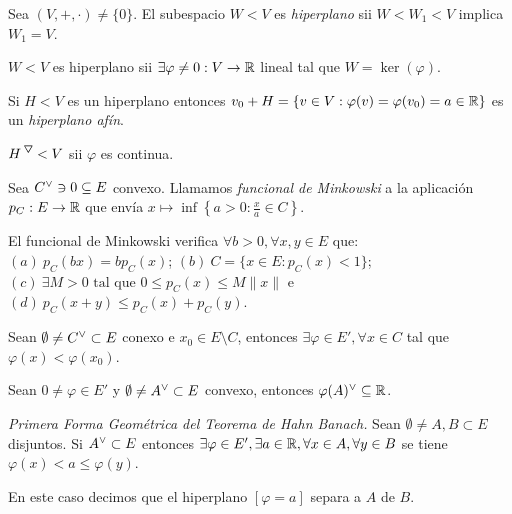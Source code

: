 \begin{definition}
    Sea \((V,+,\cdot)\neq \{0\}\). El subespacio \(W< V \) es \emph{hiperplano} sii \(W < W_1< V\) implica \(W_1= V\). 
\end{definition}
\begin{proposition}
    \(W<V\) es hiperplano sii \(\exists \varphi \neq 0: V \to \mathbb{R} \) lineal tal que \(W = \ker(\varphi)\). 
\end{proposition}
\begin{note}
    Si \(H<V\) es un hiperplano entonces \(v_0 + H = \{v\in V: \varphi(v) = \varphi(v_0) = a\in \mathbb{R}\}\) es un \emph{hiperplano afín}. 
\end{note}
\begin{proposition}
    \(H^\ce <V\) sii \(\varphi \) es continua. 
\end{proposition}
\begin{definition}
    Sea \(C^\ab \ni 0\subseteq E\) convexo. Llamamos \emph{funcional de Minkowski} a la aplicación \(p_C:E\to \mathbb{R}\) que envía \(x\mapsto \inf \left\{a>0: \frac{x}{a} \in C \right\}\). 
\end{definition}
\begin{proposition}
    El funcional de Minkowski verifica \(\forall b>0, \forall x,y\in E\) que:  \((a)\ p_C(bx) = bp_C(x)\); \((b) \ C = \{x\in E : p_C(x)<1\}\); \((c) \ \exists M>0 \text{ tal que } 0\leq p_C(x)\leq M \|x\|\) e \((d)\ p_C(x+y) \leq p_C(x)+p_C(y)\).  
\end{proposition}
\begin{proposition}
    Sean \(\emptyset \neq C^\ab \subset E \) conexo e \(x_0\in E\setminus C\), entonces \(\exists \varphi \in E', \forall x\in C\) tal que \(\varphi(x)<\varphi(x_0)\).
\end{proposition}
\begin{proposition}
    Sean \(0\neq \varphi \in E'\) y \(\emptyset \neq A^\ab  \subset E\) convexo, entonces \(\varphi(A)^\ab\subseteq \R\).  
\end{proposition}
\begin{theorem}
    \emph{Primera Forma Geométrica del Teorema de Hahn Banach.} Sean \(\emptyset \neq A,B \subset E\) disjuntos. Si \(A^\ab\subset E\) entonces \(\exists \varphi \in E', \exists a \in \mathbb{R}, \forall x\in A, \forall y\in B\) se tiene \(\varphi(x) < a \leq \varphi(y)\). 
\end{theorem}
\begin{note}
    En este caso decimos que el hiperplano \([\varphi =  a]\) separa a \(A\) de \(B\). 
\end{note}
